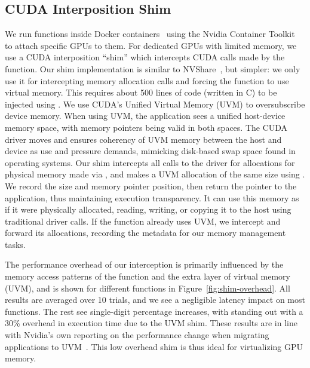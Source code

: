 \subsection{CUDA Interposition Shim}
We run functions inside Docker containers~\cite{docker-main} using the Nvidia Container Toolkit~\cite{nvidia-container} to attach specific GPUs to them. 
For dedicated GPUs with limited memory, we use a CUDA interposition ``shim'' which intercepts CUDA calls made by the function. 
Our shim implementation is similar to NVShare~\cite{alexopoulos2023nvshare}, but simpler: we only use it for intercepting memory allocation calls and forcing the function to use virtual memory.
This requires about 500 lines of code (written in C) to be injected using .
We use CUDA's Unified Virtual Memory (UVM) to oversubscribe device memory.
When using UVM, the application sees a unified host-device memory space, with memory pointers being valid in both spaces.
The CUDA driver moves and ensures coherency of UVM memory between the host and device as use and pressure demands, mimicking disk-based swap space found in operating systems.
Our shim intercepts all calls to the driver for allocations for physical memory made via , and makes a UVM allocation of the same size using .
We record the size and memory pointer position, then return the pointer to the application, thus maintaining  execution transparency. 
It can use this memory as if it were physically allocated, reading, writing, or copying it to the host using traditional driver calls. 
If the function already uses UVM, we intercept and forward its allocations, recording the metadata for our memory management tasks. 

The performance overhead of our interception is primarily influenced by the memory access patterns of the function and the extra layer of virtual memory (UVM), and is shown for different functions in Figure~\ref{fig:shim-overhead}. 
All results are averaged over 10 trials, and we see a negligible latency impact on most functions. 
The rest see single-digit percentage increases, with  standing out with a 30\% overhead in execution time due to the UVM shim. 
These results are in line with Nvidia's own reporting on the performance change when migrating applications to UVM~\cite{nvidia-uvm}.
This low overhead shim is thus ideal for virtualizing GPU memory. 

